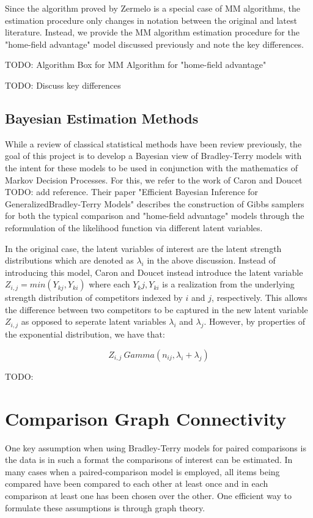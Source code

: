 \documentclass{article}
\begin{document}
Since the algorithm proved by Zermelo is a special case of MM algorithms, the estimation procedure only changes in notation between the original and latest literature. Instead, we provide the MM algorithm estimation procedure for the "home-field advantage" model discussed previously and note the key differences.

TODO: Algorithm Box for MM Algorithm for "home-field advantage"

TODO: Discuss key differences

\subsection{Bayesian Estimation Methods}

While a review of classical statistical methods have been review previously, the goal of this project is to develop a Bayesian view of Bradley-Terry models with the intent for these models to be used in conjunction with the mathematics of Markov Decision Processes. For this, we refer to the work of Caron and Doucet TODO: add reference. Their paper "Efficient Bayesian Inference for GeneralizedBradley-Terry Models" describes the construction of Gibbs samplers for both the typical comparison and "home-field advantage" models through the reformulation of the likelihood function via different latent variables. 

In the original case, the latent variables of interest are the latent strength distributions which are denoted as $\lambda_i$ in the above discussion. Instead of introducing this model, Caron and Doucet instead introduce the latent variable $Z_{i,j} = min(Y_{kj}, Y_{ki})$ where each $Y_kj, Y_{ki}$ is a realization from the underlying strength distribution of competitors indexed by $i$ and $j$, respectively. This allows the difference between two competitors to be captured in the new latent variable $Z_{i,j}$ as opposed to seperate latent variables $\lambda_i$ and $\lambda_j$. However, by properties of the exponential distribution, we have that:

$$ Z_{i,j} ~ Gamma(n_{ij}, \lambda_i + \lambda_j) $$

TODO:

\section{Comparison Graph Connectivity}

One key assumption when using Bradley-Terry models for paired comparisons is the data is in such a format the comparisons of interest can be estimated. In many cases when a paired-comparison model is employed, all items being compared have been compared to each other at least once and in each comparison at least one has been chosen over the other. One efficient way to formulate these assumptions is through graph theory.
\end{document}
